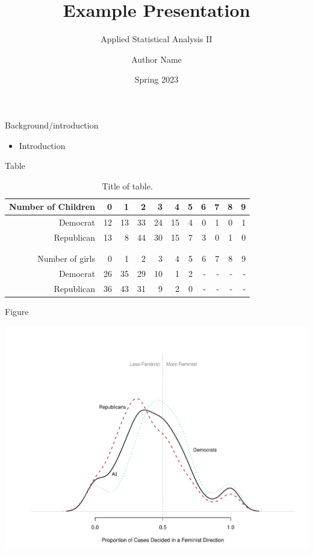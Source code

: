 \documentclass{beamer}
\title{Example Presentation}
\author{Author Name}
\subtitle{Applied Statistical Analysis II}
\date{Spring 2023}
\begin{document}
	\frame{\titlepage}

	\begin{frame}{Background/introduction}
		
		\begin{block}
			
			\begin{itemize}
				
				\item Introduction \vspace{.25cm}
				
			\end{itemize}
		\end{block}
	\end{frame}
	
	\begin{frame}{Table}

		\begin{table}[ht]
			\caption{Title of table.} 
			\centering
			\begin{tabular}{rrrrrrrrrrr}
				\hline
				Number of Children & 0 & 1 & 2 & 3 & 4 & 5 & 6 & 7 & 8 & 9 \\ 
				\hline
				Democrat &  12 &  13 &  33 &  24 &  15 &   4 &   0 &   1 &   0 &   1 \\ 
				Republican &  13 &   8 &  44 &  30 &  15 &   7 &   3 &   0 &   1 &   0 \\ 
				\\[-1.8ex]\hline 
				\hline \\[-1.8ex] 
				Number of girls & 0 & 1 & 2 & 3 & 4 & 5 & 6 & 7 & 8 & 9 \\ 
				\hline
				Democrat &  26 &  35 &  29 &  10 &   1 &   2 &-&-&-&-  \\ 
				Republican &  36 &  43 &  31 &   9 &   2 &   0 &-&-&-&-\\
				\hline
			\end{tabular}
		\end{table}
	\end{frame}
	
	\begin{frame}{Figure}
		
		\includegraphics[width=.99\textwidth]{cases_density.pdf}
		
	\end{frame}
	
\end{document}
